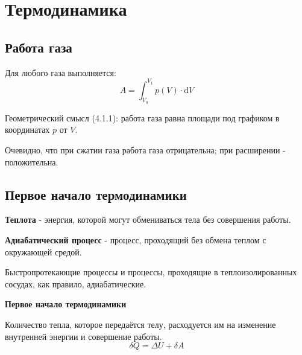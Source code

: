 \section{Термодинамика}



\subsection{Работа газа}
\begin{oframed}
Для любого газа выполняется:
\begin{equation}
A=\int_{V_0}^{V_1}{p(V)\cdot \mathrm{d}V}
\end{equation}
\end{oframed}

Геометрический смысл (4.1.1): работа газа равна площади под графиком в координатах $p$ от $V$.\par
Очевидно, что при сжатии газа работа газа отрицательна; при расширении - положительна.\par



\subsection{Первое начало термодинамики}
\textbf{Теплота} - энергия, которой могут обмениваться тела без совершения работы.\par
\textbf{Адиабатический процесс} - процесс, проходящий без обмена теплом с окружающей средой.\par
Быстропротекающие процессы и процессы, проходящие в теплоизолированных сосудах, как правило, адиабатические.\par
\begin{oframed}
\textbf{Первое начало термодинамики}\par
Количество тепла, которое передаётся телу, расходуется им на изменение внутренней энергии и совершение работы.
\begin{equation*}
\delta Q = \Delta U + \delta A
\end{equation*}
\end{oframed}